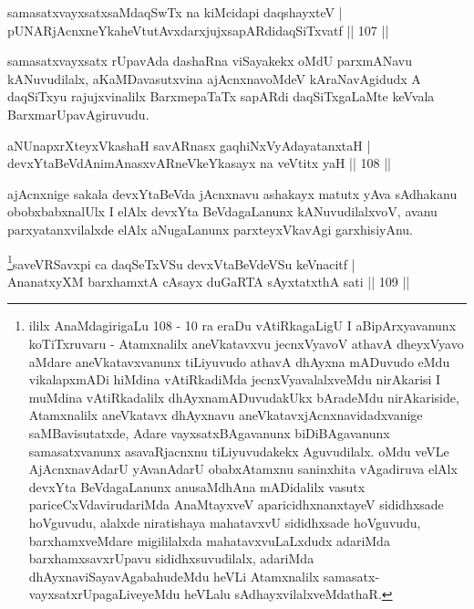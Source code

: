 \begin{shl}
samasatxvayxsatxsaMdaqSwTx na kiMcidapi daqshayxteV |\\
pUNARjAcnxneYkaheVtutAvxdarxjujxsapARdidaqSiTxvatf \hfill || 107 ||
\end{shl}

\begin{artha}
samasatxvayxsatx rUpavAda dashaRna viSayakekx oMdU parxmANavu kANuvudilalx, aKaMDavasutxvina ajAcnxnavoMdeV kAraNavAgidudx A daqSiTxyu rajujxvinalilx BarxmepaTaTx sapARdi daqSiTxgaLaMte keVvala BarxmarUpavAgiruvudu.
\end{artha}


\begin{shl}
aNUnapxrXteyxVkashaH savARnasx gaqhiNxVyAdayatanxtaH |\\
devxYtaBeVdAnimAnasxvARneVkeYkasayx na veVtitx yaH \hfill || 108 ||
\end{shl}

\begin{artha}
ajAcnxnige sakala devxYtaBeVda jAcnxnavu ashakayx matutx yAva sAdhakanu obobxbabxnalUlx I elAlx devxYta BeVdagaLanunx kANuvudilalxvoV, avanu parxyatanxvilalxde elAlx aNugaLanunx parxteyxVkavAgi garxhisiyAnu.
\end{artha}


\begin{shl}
\footnote{ililx AnaMdagirigaLu 108 - 10 ra eraDu vAtiRkagaLigU I aBipArxyavanunx koTiTxruvaru - Atamxnalilx aneVkatavxvu jecnxVyavoV athavA dheyxVyavo aMdare aneVkatavxvanunx tiLiyuvudo athavA dhAyxna mADuvudo eMdu vikalapxmADi hiMdina vAtiRkadiMda jecnxVyavalalxveMdu nirAkarisi I muMdina vAtiRkadalilx dhAyxnamADuvudakUkx bAradeMdu nirAkariside, Atamxnalilx aneVkatavx dhAyxnavu aneVkatavxjAcnxnavidadxvanige saMBavisutatxde, Adare vayxsatxBAgavanunx biDiBAgavanunx samasatxvanunx asavaRjacnxnu tiLiyuvudakekx Aguvudilalx. oMdu veVLe AjAcnxnavAdarU yAvanAdarU obabxAtamxnu saninxhita vAgadiruva elAlx devxYta BeVdagaLanunx anusaMdhAna mADidalilx vasutx pariceCxVdavirudariMda AnaMtayxveV aparicidhxnanxtayeV sididhxsade hoVguvudu, alalxde niratishaya mahatavxvU sididhxsade hoVguvudu, barxhamxveMdare migililalxda mahatavxvuLaLxdudx adariMda barxhamxsavxrUpavu sididhxsuvudilalx, adariMda dhAyxnaviSayavAgabahudeMdu heVLi Atamxnalilx samasatx-vayxsatxrUpagaLiveyeMdu heVLalu sAdhayxvilalxveMdathaR.}saveVRSavxpi ca daqSeTxVSu devxVtaBeVdeVSu keVnacitf |\\
AnanatxyXM barxhamxtA cAsayx duGaRTA sAyxtatxthA sati \hfill || 109 ||
\end{shl}

